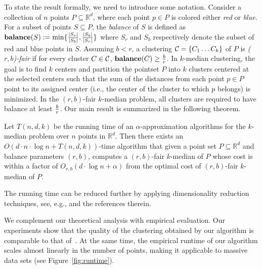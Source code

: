 To state the result formally, we need to introduce some notation. Consider a collection of $n$ points $P \subseteq \mathbb{R}^d$, where each point $p \in P$ is colored either {\em red} or {\em blue}. For a subset of points $S\subseteq P$, the {\em balance} of $S$ is defined as $\mathbf{balance}(S) := \min\{{|S_r| \over |S_b|}, {|S_b| \over |S_r|}\}$ where $S_r$ and $S_b$ respectively denote the subset of red and blue points in $S$.
Assuming $b<r$, a clustering $\mathcal{C}=\{C_1 \ldots C_k\}$  of $P$ is {\em ($r,b$)-fair} if for every cluster $C\in \mathcal{C}$, $\mathbf{balance}(C) \geq {b\over r}$. 
In $k$-median clustering, the goal is to find $k$ centers and partition the pointset $P$ into $k$ clusters centered at the selected centers such that the sum of the distances from each point $p\in P$ point to its assigned center (i.e., the center of the cluster to which $p$ belongs) is minimized. In the $(r,b)$-fair $k$-median problem, all clusters are required to have balance at least ${b\over r}$.
Our main result is summarized in the following theorem. 
\begin{theorem}\label{thm:main-fair-k-median}
Let $T(n,d,k)$ be the running time of an $\alpha$-approximation algorithms for the $k$-median problem over $n$ points in $\mathbb{R}^d$. 
Then there exists an $O(d\cdot n \cdot \log n + T(n,d,k))$-time algorithm that given a point set $P\subseteq \mathbb{R}^d$ and balance parameters $(r,b)$, computes a $(r,b)$-fair $k$-median of $P$ whose cost is within a factor of $O_{r,b}(d \cdot \log n + \alpha)$  from the optimal  cost of $(r,b)$-fair $k$-median of $P$.
\end{theorem}

The running time can be reduced further by applying dimensionality reduction techniques, see, e.g., \citep{cohen2015dimensionality, makarychev2018performance} and the references therein.

We complement our theoretical analysis with empirical evaluation. Our experiments show that the quality of the clustering obtained by our algorithm is comparable to that of~\cite{chierichetti2017fair}. At the same time, the empirical runtime of our algorithm scales almost linearly in the number of points, making it applicable to massive data sets (see Figure~\ref{fig:runtime}).  


